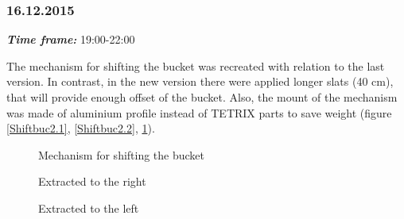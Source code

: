 \subsubsection{16.12.2015}
\textit{\textbf{Time frame:}} 19:00-22:00 

The mechanism for shifting the bucket was recreated with relation to the last version. In contrast, in the new version there were applied longer slats (40 cm), that will provide enough offset of the bucket. Also, the mount of the mechanism was made of aluminium profile instead of TETRIX parts to save weight (figure \ref{Shiftbuc2.1}, \ref{Shiftbuc2.2}, \ref{Shiftbuc2.3}).

\begin{figure}[H]
	\begin{minipage}[h]{0.47\linewidth}
		\caption{Mechanism for shifting the bucket}
		\label{Shiftbuc2.1}
	\end{minipage}
	\hfill
	\begin{minipage}[h]{0.47\linewidth}
		\caption{Extracted to the right}
		\label{Shiftbuc2.2}
	\end{minipage}
	\hfill
	\begin{minipage}[h]{1\linewidth}
		\caption{Extracted to the left}
		\label{Shiftbuc2.3}
	\end{minipage}
\end{figure}
